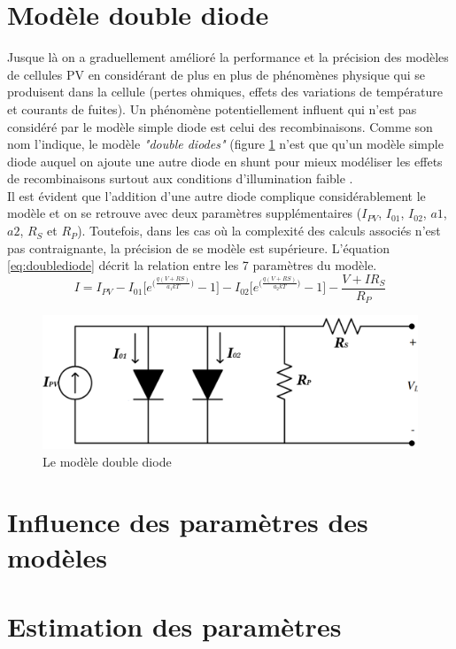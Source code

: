 \section{Modèle double diode}

Jusque là on a graduellement amélioré la performance et la précision des modèles de cellules PV en considérant de plus en plus de phénomènes physique qui se produisent dans la cellule (pertes ohmiques, effets des variations de température et courants de fuites). Un phénomène potentiellement influent qui n'est pas considéré par le modèle simple diode est celui des recombinaisons. Comme son nom l'indique, le modèle \textit{"double diodes"} (figure \ref{fig:doublediode} n'est que qu'un modèle simple diode auquel on ajoute une autre diode en shunt pour mieux modéliser les effets de recombinaisons surtout aux conditions d'illumination faible \cite{Chin2015b}.\\
Il est évident que l'addition d'une autre diode complique considérablement le modèle et on se retrouve avec deux paramètres supplémentaires ($I_{PV}$, $I_{01}$, $I_{02}$, $a1$, $a2$, $R_S$ et $R_P$). Toutefois, dans les cas où la complexité des calculs associés n'est pas contraignante, la précision de se modèle est supérieure. L'équation \ref{eq:doublediode} décrit la relation entre les 7 paramètres du modèle.
\begin{equation}
  \label{eq:doublediode}
  I = I_{PV} - I_{01} \bigg[e^{\big(\frac{q(V + RS)}{a_1kT}\big)} - 1\bigg] - I_{02} \bigg[e^{\big(\frac{q(V + RS)}{a_2kT}\big)} - 1\bigg] - \frac{V + I R_S}{R_P}
\end{equation}
\begin{figure}
  \begin{center}
    \includegraphics[width=.5\textwidth]{resources/doublediode.png}
    \caption{Le modèle double diode}
    \label{fig:doublediode}
  \end{center}
\end{figure}

\section{Influence des paramètres des modèles}

\section{Estimation des paramètres}

